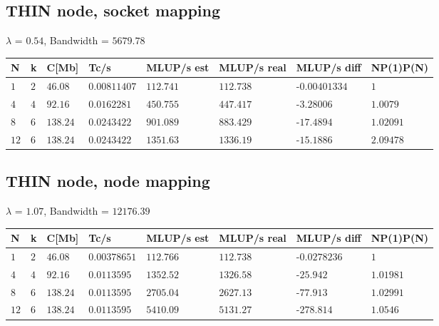 \documentclass[11pt,a4paper]{article}
\begin{document}
\subsection*{THIN node, socket mapping}
$\lambda$ = $0.54$, Bandwidth = $5679.78$
\begin{table}[H]
    \centering
    \begin{tabular}{|l|l|l|l|l|l|l|l|}
    \toprule
    N 		& k 	& C[Mb] 	& Tc/s 			& MLUP/s est 	& MLUP/s real 	& MLUP/s diff  & NP(1)P(N) \\
    \midrule
    $1$ 	& $2$ 	& $46.08$ 	& $0.00811407$ 	& $112.741$ 	& $112.738$ 	&-$0.00401334$ & $1$ \\
    $4$ 	& $4$ 	& $92.16$ 	& $0.0162281$ 	& $450.755$ 	& $447.417$ 	&-$3.28006$ & $1.0079$ \\
    $8$ 	& $6$ 	& $138.24$ 	& $0.0243422$ 	& $901.089$ 	& $883.429$ 	&-$17.4894$ & $1.02091$ \\
    $12$ 	& $6$ 	& $138.24$ 	& $0.0243422$ 	& $1351.63$ 	& $1336.19$ 	&-$15.1886$ & $2.09478$ \\
    \bottomrule
    \end{tabular}
\end{table}
\subsection*{THIN node, node mapping}
$\lambda$ = $1.07$, Bandwidth = $12176.39$
\begin{table}[H]
    \centering
    \begin{tabular}{|l|l|l|l|l|l|l|l|}
    \toprule
    N 		& k 	& C[Mb] 	& Tc/s 			& MLUP/s est 	& MLUP/s real 	& MLUP/s diff  & NP(1)P(N) \\
    \midrule
    $1$ 	& $2$ 	& $46.08$ 	& $0.00378651$ 	& $112.766$ 	& $112.738$ 	&-$0.0278236$ & $1$ \\
    $4$ 	& $4$ 	& $92.16$ 	& $0.0113595$ 	& $1352.52$ 	& $1326.58$ 	&-$25.942$ & $1.01981$ \\
    $8$ 	& $6$ 	& $138.24$ 	& $0.0113595$ 	& $2705.04$ 	& $2627.13$ 	&-$77.913$ & $1.02991$ \\
    $12$ 	& $6$ 	& $138.24$ 	& $0.0113595$ 	& $5410.09$ 	& $5131.27$ 	&-$278.814$ & $1.0546$ \\
    \bottomrule
    \end{tabular}
\end{table}
\end{document}
